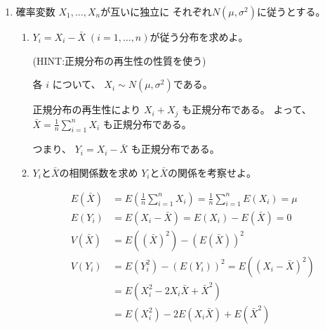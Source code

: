 \documentclass[12pt,b5paper]{ltjsarticle}
\begin{document}
\begin{enumerate}
\begin{enumerate}
            \hrulefill

      \end{enumerate}

 \item
      確率変数 $X_{1},\dots,X_{n}$が互いに独立に
      それぞれ$N(\mu,\sigma^{2})$に従うとする。
      \begin{enumerate}
       \item
            $Y_{i}=X_{i}-\bar{X} \;(i=1,\dots,n)$が従う分布を求めよ。

            (HINT:正規分布の再生性の性質を使う)

            \dotfill

            各 $i$ について、
            $X_{i} \sim N(\mu,\sigma^{2})$である。

            正規分布の再生性により
            $X_{i}+X_{j}$
            も正規分布である。
            よって、
            $\bar{X} = \frac{1}{n}\sum_{i=1}^{n}X_{i}$
            も正規分布である。

            つまり、
            $Y_{i} = X_{i}-\bar{X}$
            も正規分布である。

            \hrulefill


       \item
            $Y_{i}$と$\bar{X}$の相関係数を求め
            $Y_{i}$と$\bar{X}$の関係を考察せよ。

            \dotfill

            \begin{align}
             E(\bar{X})
             &=E\left( \frac{1}{n}\sum_{i=1}^{n}X_{i} \right)
              = \frac{1}{n}\sum_{i=1}^{n}E(X_{i})
              =\mu\\
             E(Y_{i})
             &= E(X_{i}-\bar{X})
             = E(X_{i})-E(\bar{X})
             =0\\
             V(\bar{X})
             &= E((\bar{X})^{2}) - (E(\bar{X}))^{2}
             \\
             V(Y_{i})
             &= E(Y_{i}^{2}) - (E(Y_{i}))^{2}
             = E((X_{i}-\bar{X})^{2})\\
             &= E(X_{i}^{2}-2X_{i}\bar{X}+\bar{X}^{2})\\
             &= E(X_{i}^{2})-2E(X_{i}\bar{X})+E(\bar{X}^{2})
            \end{align}


\end{enumerate}
\end{enumerate}
\end{document}
